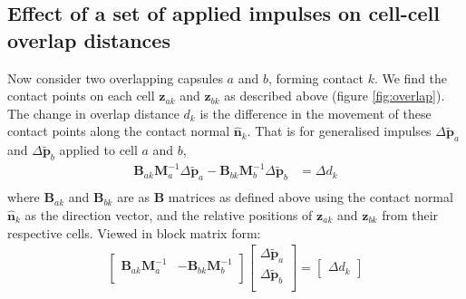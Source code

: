 \documentclass{report}
\let\oldhat\hat
\renewcommand{\vec}[1]{\mathbf{#1}}
\renewcommand{\hat}[1]{\oldhat{\mathbf{#1}}}
\newcommand{\mat}{\mathbf}
\newcommand{\Minv}{\mat{M}^{-1}}
\begin{document}
\subsection{Effect of a set of applied impulses on cell-cell overlap distances}
Now consider two overlapping capsules $a$ and $b$, forming contact $k$. We find the contact points on
each cell $\vec{z}_{ak}$ and $\vec{z}_{bk}$ as described above (figure \ref{fig:overlap}). The
change in overlap distance $d_k$ is the difference in the movement of these
contact points along the contact normal $\hat{n}_k$. That is for generalised
impulses $\Delta\tilde{\vec{p}}_a$ and $\Delta\tilde{\vec{p}}_b$ applied to cell
$a$ and $b$,
\begin{align*}
\mat{B}_{ak} \Minv_a \Delta\tilde{\vec{p}}_a -
\mat{B}_{bk} \Minv_b \Delta\tilde{\vec{p}}_b
&=
\Delta d_k \\
\end{align*}
where $\mat{B}_{ak}$
and $\mat{B}_{bk}$ are as $\mat{B}$ matrices as defined above using the contact normal 
$\hat{\vec{n}}_k$ as the direction vector, and the relative positions of
$\vec{z}_{ak}$ and $\vec{z}_{bk}$ from their respective cells.  Viewed in block matrix form:
\begin{align*}
\left[
\begin{array}{ll}
\mat{B}_{ak} \Minv_a &
-\mat{B}_{bk} \Minv_b \\
\end{array}
\right]
\left[
\begin{array}{l}
\Delta\tilde{\vec{p}}_a \\
\Delta\tilde{\vec{p}}_b \\
\end{array}
\right]
=
\left[
\begin{array}{l}
\Delta d_k
\end{array}
\right]
\end{align*}
\end{document}

